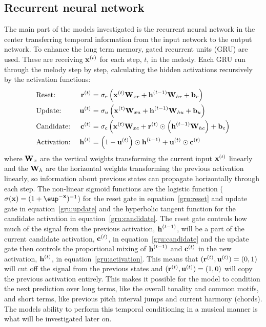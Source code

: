 \subsection{Recurrent neural network} %
\label{sub:recurrent_neural_network}
	The main part of the models investigated is the recurrent neural network in the center transferring temporal information from the input network to the output network.
	To enhance the long term memory, gated recurrent units (GRU) are used. These are receiving $\bm{\mathrm{x}}^{(t)}$ for each step, $t$, in the melody. Each GRU run through the melody step by step, calculating the hidden activations recursively by the activation functions:
	\begin{alignat}{2}
	 	& \text{Reset:} \; & \bm{\mathrm{r}}^{(t)} &= \sigma_r\left(\bm{\mathrm{x}}^{(t)} \bm{\mathrm{W}}_{xr} + \bm{\mathrm{h}}^{(t-1)} \bm{\mathrm{W}}_{hr} + \bm{\mathrm{b}}_r\right) \label{gru:reset} \\
        & \text{Update:} \; & \bm{\mathrm{u}}^{(t)} &= \sigma_u\left(\bm{\mathrm{x}}^{(t)} \bm{\mathrm{W}}_{xu} + \bm{\mathrm{h}}^{(t-1)} \bm{\mathrm{W}}_{hu} + \bm{\mathrm{b}}_u\right) \label{gru:update} \\
        & \text{Candidate:} \; & \bm{\mathrm{c}}^{(t)} &= \sigma_c\left(\bm{\mathrm{x}}^{(t)} \bm{\mathrm{W}}_{xc} + \bm{\mathrm{r}}^{(t)} \odot \left(\bm{\mathrm{h}}^{(t-1)} \bm{\mathrm{W}}_{hc}\right) + \bm{\mathrm{b}}_c\right) \label{gru:candidate} \\
        & \text{Activation:} \; & \bm{\mathrm{h}}^{(t)} &= \left(1 - \bm{\mathrm{u}}^{(t)}\right) \odot \bm{\mathrm{h}}^{(t-1)} + \bm{\mathrm{u}}^{(t)} \odot \bm{\mathrm{c}}^{(t)} \label{gru:activation}
	\end{alignat}
	where $\bm{\mathrm{W}}_x$ are the vertical weights transforming the current input $\bm{\mathrm{x}}^{(t)}$ linearly and the $\bm{\mathrm{W}}_h$ are the horizontal weights transforming the previous activation linearly, so information about previous states can propagate horizontally through each step. The non-linear sigmoid functions are the logistic function ($\sigma(\vec{x})=(1+\eup^{-\vec{x}})^{-1}$) for the reset gate in equation~\eqref{gru:reset} and update gate in equation~\eqref{gru:update} and the hyperbolic tangent function for the candidate activation in equation~\eqref{gru:candidate}. The reset gate controls how much of the signal from the previous activation, $\bm{\mathrm{h}}^{(t-1)}$, will be a part of the current candidate activation, $\bm{\mathrm{c}}^{(t)}$, in equation~\eqref{gru:candidate} and the update gate then controls the proportional mixing of $\bm{\mathrm{h}}^{(t-1)}$ and $\bm{\mathrm{c}}^{(t)}$ in the new activation, $\bm{\mathrm{h}}^{(t)}$, in equation~\eqref{gru:activation}. This means that $(\bm{\mathrm{r}}^{(t)}, \bm{\mathrm{u}}^{(t)}) = (0,1)$ will cut off the signal from the previous states and $(\bm{\mathrm{r}}^{(t)}, \bm{\mathrm{u}}^{(t)}) = (1,0)$ will copy the previous activation entirely. This makes it possible for the model to condition the next prediction over long terms, like the overall tonality and common motifs, and short terms, like previous pitch interval jumps and current harmony (chords). The models ability to perform this temporal conditioning in a musical manner is what will be investigated later on. 

